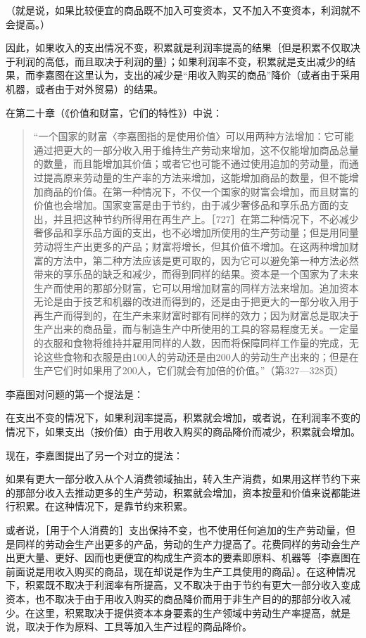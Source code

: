 （就是说，如果比较便宜的商品既不加入可变资本，又不加入不变资本，利润就不会提高。）

因此，如果收入的支出情况不变，积累就是利润率提高的结果｛但是积累不仅取决于利润的高低，而且取决于利润的量｝；如果利润率不变，积累就是支出减少的结果，而李嘉图在这里认为，支出的减少是“用收入购买的商品”降价（或者由于采用机器，或者由于对外贸易）的结果。

在第二十章（《价值和财富，它们的特性》）中说：

\begin{quote}{“一个国家的财富〈李嘉图指的是使用价值〉可以用两种方法增加：它可能通过把更大的一部分收入用于维持生产劳动来增加，这不仅能增加商品总量的数量，而且能增加其价值；或者它也可能不通过使用追加的劳动量，而通过提高原来劳动量的生产率的方法来增加，这能增加商品的数量，但不能增加商品的价值。在第一种情况下，不仅一个国家的财富会增加，而且财富的价值也会增加。国家变富是由于节约，由于减少奢侈品和享乐品方面的支出，并且把这种节约所得用在再生产上。［727］在第二种情况下，不必减少奢侈品和享乐品方面的支出，也不必增加所使用的生产劳动量；但是用同量劳动将生产出更多的产品；财富将增长，但其价值不增加。在这两种增加财富的方法中，第二种方法应该是更可取的，因为它可以避免第一种方法必然带来的享乐品的缺乏和减少，而得到同样的结果。资本是一个国家为了未来生产而使用的那部分财富，它可以用增加财富的同样方法来增加。追加资本无论是由于技艺和机器的改进而得到的，还是由于把更大的一部分收入用于再生产而得到的，在生产未来财富时都有同样的效力；因为财富总是取决于生产出来的商品量，而与制造生产中所使用的工具的容易程度无关。一定量的衣服和食物将维持并雇用同样的人数，因而将保障同样工作量的完成，无论这些食物和衣服是由100人的劳动还是由200人的劳动生产出来的；但是在生产它们时如果用了200人，它们就会有加倍的价值。”（第327—328页）}\end{quote}

李嘉图对问题的第一个提法是：

在支出不变的情况下，如果利润率提高，积累就会增加，或者说，在利润率不变的情况下，如果支出（按价值）由于用收入购买的商品降价而减少，积累就会增加。

现在，李嘉图提出了另一个对立的提法：

如果有更大一部分收入从个人消费领域抽出，转入生产消费，如果用这样节约下来的那部分收入去推动更多的生产劳动，积累就会增加，资本按量和价值来说都能进行积累。在这种情况下，是靠节约来积累。

或者说，［用于个人消费的］支出保持不变，也不使用任何追加的生产劳动量，但是同样的劳动会生产出更多的产品，劳动的生产力提高了。花费同样的劳动会生产出更大量、更好、因而也更便宜的构成生产资本的要素即原料、机器等｛李嘉图在前面说是用收入购买的商品，现在却说是作为生产工具使用的商品｝。在这种情况下，积累既不取决于利润率有所提高，又不取决于由于节约有更大一部分收入变成资本，也不取决于由于用收入购买的商品降价而用于非生产目的的那部分收入减少。在这里，积累取决于提供资本本身要素的生产领域中劳动生产率提高，就是说，取决于作为原料、工具等加入生产过程的商品降价。


